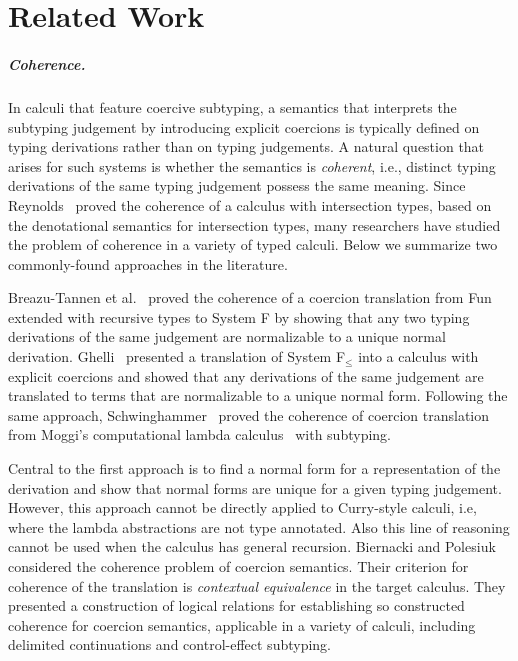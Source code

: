 
\section{Related Work}
\label{sec:related}

\subparagraph{Coherence.}
In calculi that feature coercive subtyping, a semantics that interprets the
subtyping judgement by introducing explicit coercions is typically defined on
typing derivations rather than on typing judgements. A natural
question that arises
for such systems is whether the semantics is \textit{coherent}, i.e.,
distinct typing derivations of the same typing judgement possess the same
meaning. Since Reynolds~\cite{Reynolds_1991} proved the coherence of a calculus with
intersection types, based on the denotational semantics for intersection types,
many researchers have studied the problem of coherence in a variety of typed
calculi. Below we summarize two commonly-found approaches in the literature.

Breazu-Tannen et al.~\cite{Breazu_Tannen_1991} proved
the coherence of a coercion translation from Fun~\cite{cardelli1985understanding}
extended with recursive types to System F by showing that any two
typing derivations of the same judgement are normalizable to a unique
normal derivation. %
Ghelli~\cite{Curien_1992} presented a translation of System F$_\leq$ into a calculus
with explicit coercions and showed that any derivations of the same judgement are
translated to terms that are normalizable to a unique normal form. Following the
same approach, Schwinghammer~\cite{SCHWINGHAMMER_2008} proved the coherence of coercion
translation from Moggi's computational lambda calculus~\cite{Moggi_1991} with subtyping.



Central to the first approach is to find a normal form for a representation of
the derivation and show that normal forms are unique for a given typing
judgement. However, this approach cannot be directly applied to Curry-style
calculi, i.e, where the lambda abstractions are not type annotated. Also this
line of reasoning cannot be used when the calculus has general recursion.
Biernacki and Polesiuk~\cite{biernacki2015logical} considered the coherence
problem of coercion semantics. Their criterion for coherence of the translation is
\textit{contextual equivalence} in the target calculus. They presented a construction of
logical relations for establishing so constructed coherence for coercion semantics,
applicable in a variety of calculi, including delimited continuations and
control-effect subtyping.

